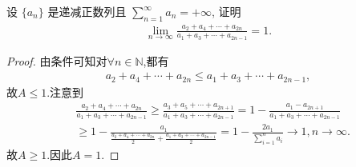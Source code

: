 \documentclass[../../main.tex]{subfiles}
\begin{document}
\begin{example}
设 $\{a_n\}$ 是递减正数列且 $\sum\limits_{n=1}^{\infty}a_n = +\infty$, 证明
\begin{align*}
\lim_{n\rightarrow \infty}\frac{a_2+a_4+\cdots +a_{2n}}{a_1+a_3+\cdots +a_{2n-1}} = 1.
\end{align*}
\end{example}
\begin{proof}
由条件可知对$\forall n\in \mathbb{N}$,都有
\begin{align*}
a_2+a_4+\cdots +a_{2n}\leqslant a_1+a_3+\cdots +a_{2n-1},
\end{align*}
故$A\leqslant 1$.注意到
\begin{align*}
&\frac{a_2+a_4+\cdots +a_{2n}}{a_1+a_3+\cdots +a_{2n-1}}\geqslant \frac{a_3+a_5+\cdots +a_{2n+1}}{a_1+a_3+\cdots +a_{2n-1}}=1-\frac{a_1-a_{2n+1}}{a_1+a_3+\cdots +a_{2n-1}}
\\
&\geqslant 1-\frac{a_1}{\frac{a_2+a_4+\cdots +a_{2n}}{2}+\frac{a_1+a_3+\cdots +a_{2n-1}}{2}}=1-\frac{2a_1}{\sum\limits_{i=1}^n{a_i}}\rightarrow 1,n\rightarrow \infty .
\end{align*}
故$A\geqslant 1$.因此$A=1$.
\end{proof}
\end{document}
